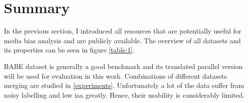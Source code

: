 \section{Summary}
In the previous section, I introduced all resources that are potentially useful for media bias analysis and are publicly available. The overview of all datasets and its properties can be seen in figure \ref{table:1}.

BABE dataset is generally a good benchmark and its translated parallel version will be used for evaluation in this work. Combinations of different datasets merging are studied in \ref{experiments}. Unfortunately a lot of the data suffer from noisy labelling and low \gls{iaa} greatly. Hence, their usability is considerably limited.

